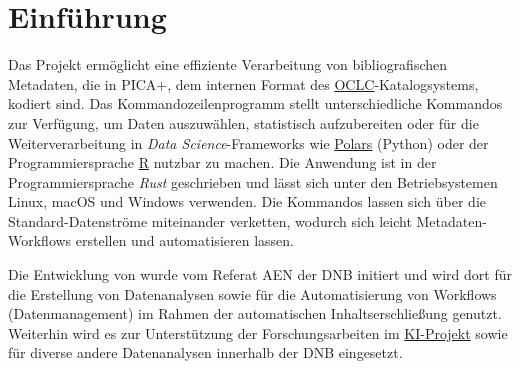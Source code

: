 \chapter{Einführung}
\label{ch:01}

Das Projekt  ermöglicht eine effiziente Verarbeitung von
bibliografischen Metadaten, die in PICA+, dem internen Format des
\href{https://www.oclc.org/}{OCLC}-Katalogsystems, kodiert sind. Das
Kommandozeilenprogramm \pica{} stellt unterschiedliche Kommandos zur
Verfügung, um Daten auszuwählen, statistisch aufzubereiten oder für
die Weiterverarbeitung in \emph{Data Science}-Frameworks wie
\href{https://pola.rs/}{Polars} (Python) oder der Programmiersprache
\href{https://www.r-project.org/}{R} nutzbar zu machen. Die Anwendung
ist in der Programmiersprache \textit{Rust} geschrieben und lässt sich
unter den Betriebsystemen Linux, macOS und Windows verwenden. Die
Kommandos lassen sich über die Standard-Datenströme miteinander
verketten, wodurch sich leicht Metadaten-Workflows erstellen und
automatisieren lassen.

Die Entwicklung von  wurde vom Referat \ac{AEN} der
\ac{DNB} initiert und wird dort für die Erstellung von Datenanalysen
sowie für die Automatisierung von Workflows (Datenmanagement) im
Rahmen der automatischen Inhaltserschließung genutzt. Weiterhin wird
es zur Unterstützung der Forschungsarbeiten im
\href{https://www.dnb.de/ki-projekt}{KI-Projekt} sowie für diverse
andere Datenanalysen innerhalb der \ac{DNB} eingesetzt.

